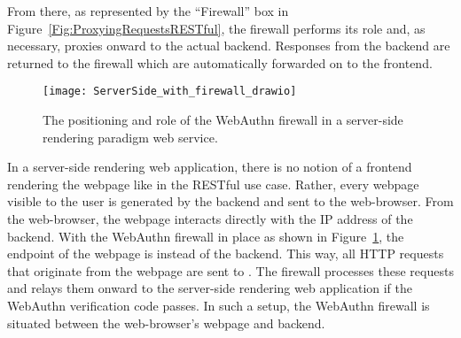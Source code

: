 From there, as represented by the ``Firewall'' box in Figure~\ref{Fig:ProxyingRequestsRESTful}, the firewall performs its role and, as necessary, proxies onward to the actual backend. Responses from the backend are returned to the firewall which are automatically forwarded on to the frontend. 

\begin{figure}[h]
  \centering
  \texttt{[image: ServerSide\_with\_firewall\_drawio]}
  \caption{The positioning and role of the WebAuthn firewall in a server-side rendering paradigm web service.}
  \label{Fig:ProxyingRequestsServerSide}
\end{figure}


In a server-side rendering web application, there is no notion of a frontend rendering the webpage like in the RESTful use case. Rather, every webpage visible to the user is generated by the backend and sent to the web-browser. From the web-browser, the webpage interacts directly with the IP address of the backend. With the WebAuthn firewall in place as shown in Figure~\ref{Fig:ProxyingRequestsServerSide}, the endpoint of the webpage is \sys{} instead of the backend. This way, all HTTP requests that originate from the webpage are sent to \sys{}. The firewall processes these requests and relays them onward to the server-side rendering web application if the WebAuthn verification code passes. In such a setup, the WebAuthn firewall is situated between the web-browser's webpage and backend.




